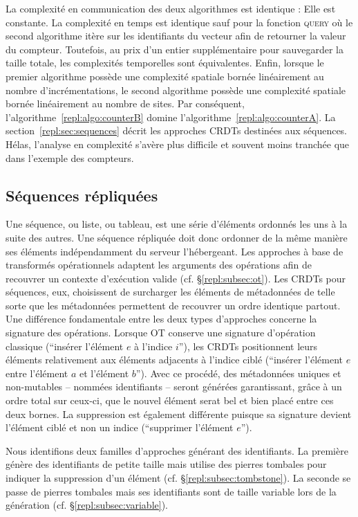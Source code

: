 La complexité en communication des deux algorithmes est identique : Elle est
constante. La complexité en temps est identique sauf pour la fonction
\textsc{query} où le second algorithme itère sur les identifiants du vecteur
afin de retourner la valeur du compteur. Toutefois, au prix d'un entier
supplémentaire pour sauvegarder la taille totale, les complexités temporelles
sont équivalentes. Enfin, lorsque le premier algorithme possède une complexité
spatiale bornée linéairement au nombre d'incrémentations, le second algorithme
possède une complexité spatiale bornée linéairement au nombre de sites. Par
conséquent, l'algorithme~\ref{repl:algo:counterB} domine
l'algorithme~\ref{repl:algo:counterA}. La section~\ref{repl:sec:sequences}
décrit les approches CRDTs destinées aux séquences. Hélas, l'analyse en
complexité s'avère plus difficile et souvent moins tranchée que dans l'exemple
des compteurs.


\subsection{Séquences répliquées}
\label{repl:subsec:sequences}

Une séquence, ou liste, ou tableau, est une série d'éléments ordonnés les uns à
la suite des autres. Une séquence répliquée doit donc ordonner de la même
manière ses éléments indépendamment du serveur l'hébergeant. Les approches à
base de transformés opérationnels adaptent les arguments des opérations afin de
recouvrer un contexte d'exécution valide (cf. §\ref{repl:subsec:ot}). Les CRDTs
pour séquences, eux, choisissent de surcharger les éléments de métadonnées de
telle sorte que les métadonnées permettent de recouvrer un ordre identique
partout. Une différence fondamentale entre les deux types d'approches concerne
la signature des opérations. Lorsque OT conserve une signature d'opération
classique (``insérer l'élément $e$ à l'indice $i$''), les CRDTs positionnent
leurs éléments relativement aux éléments adjacents à l'indice ciblé (``insérer
l'élément $e$ entre l'élément $a$ et l'élément $b$''). Avec ce procédé, des
métadonnées uniques et non-mutables -- nommées identifiants -- seront générées
garantissant, grâce à un ordre total sur ceux-ci, que le nouvel élément serat
bel et bien placé entre ces deux bornes. La suppression est également différente
puisque sa signature devient l'élément ciblé et non un indice (``supprimer
l'élément $e$'').

Nous identifions deux familles d'approches générant des identifiants. La
première génère des identifiants de petite taille mais utilise des pierres
tombales pour indiquer la suppression d'un élément
(cf. §\ref{repl:subsec:tombstone}). La seconde se passe de pierres tombales mais
ses identifiants sont de taille variable lors de la génération
(cf. §\ref{repl:subsec:variable}).

